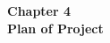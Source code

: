 \documentclass[12pt]{article}
\begin{document}
\vspace*{\fill}
\begin{center}
    {\Large \bfseries Chapter 4} \\[2em]
    {\Large \bfseries Plan of Project}
\end{center}
\vspace*{\fill}
\newpage %

\end{document}
